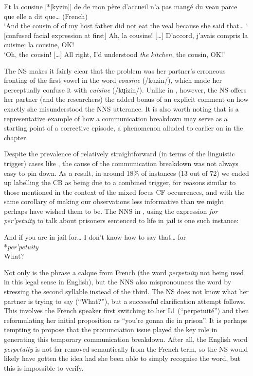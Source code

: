 \documentclass[output=paper,colorlinks,citecolor=brown,modfonts,nonflat]{../langscibook}
\begin{document}
\ea\label{ex:scheuer:18}
{\NNS} {Et} {la} {cousine} [*[kyzin]] {de} {de} {mon} {père} {d'accueil} {n'a} {pas} {mangé} {du}
{veau} {parce} {que} {elle} {a} {dit} {que…}  (French)\\
‘And the cousin of of my host father did not eat the veal because she said that… ‘\\
{\NS} [confused facial expression at first] {Ah,} {la} {cousine!} {[…]} {D'accord,} {j'avais} {compris} la cuisine{;} {la} {cousine,} {OK!}\\
‘Oh, the cousin! […] All right, I’d understood \textit{the} \textit{kitchen}, the cousin, OK!’
\z

The NS makes it fairly clear that the problem was her partner’s erroneous fronting of the first vowel in the word \textit{cousine} (/kuzin/), which made her perceptually confuse it with \textit{cuisine} (/kɥizin/). Unlike in , however, the NS offers her partner (and the researchers) the added bonus of an explicit comment on how exactly she misunderstood the NNS utterance. It is also worth noting that  is a representative example of how a communication breakdown may serve as a starting point of a corrective episode, a phenomenon alluded to earlier on in the chapter.

Despite the prevalence of relatively straightforward (in terms of the linguistic trigger) cases like , the cause of the communication breakdown was not always easy to pin down. As a result, in around 18\% of instances (13 out of 72) we ended up labelling the CB as being due to a combined trigger, for reasons similar to those mentioned in the context of the mixed focus CF occurrences, and with the same corollary of making our observations less informative than we might perhaps have wished them to be. The NNS in , using the expression \textit{for} \textit{per'petuity} to talk about prisoners sentenced to life in jail is one such instance:

\ea\label{ex:scheuer:19}
{\NNS} {And} {if} {you} {are} {in} {jail} {for…} {I} {don’t} {know} {how} {to} {say} {that…} {for}\\
*\textit{per{}'petuity}\\
{\NS} {What?}
\z

Not only is the phrase a calque from French (the word \textit{perpetuity} not being used in this legal sense in English), but the NNS also mispronounces the word by stressing the second syllable instead of the third. The NS does not know what her partner is trying to say (“What?”), but a successful clarification attempt follows. This involves the French speaker first switching to her L1 (“perpetuité”) and then reformulating her initial proposition as “you’re gonna die in prison”. It is perhaps tempting to propose that the pronunciation issue played the key role in generating this temporary communication breakdown. After all, the English word \textit{perpetuity} is not far removed semantically from the French term, so the NS would likely have gotten the idea had she been able to simply recognise the word, but this is impossible to verify.
\end{document}
